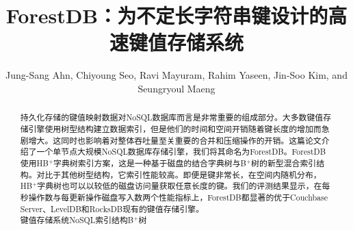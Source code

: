 \documentclass[lang=cn]{cls/elegantpaper}
\title{ForestDB：为不定长字符串键设计的高速键值存储系统}
\author{Jung-Sang Ahn, Chiyoung Seo, Ravi Mayuram, Rahim Yaseen, Jin-Soo Kim, and Seungryoul Maeng}
\begin{document}
\maketitle

\begin{abstract}
\noindent \sffamily 持久化存储的键值映射数据对NoSQL数据库而言是非常重要的组成部分。大多数键值存储引擎使用树型结构建立数据索引，但是他们的时间和空间开销随着键长度的增加而急剧增大。这同时也影响着对整体吞吐量至关重要的合并和压缩操作的开销。这篇论文介绍了一个单节点大规模NoSQL数据库存储引擎，我们将其命名为ForestDB。ForestDB使用HB$^+$字典树索引方案，这是一种基于磁盘的结合字典树与B$^+$树的新型混合索引结构。对比于其他树型结构，它索引性能较高。即便是键非常长，在空间内随机分布，HB$^+$字典树也可以以较低的磁盘访问量获取任意长度的键。我们的评测结果显示，在每秒操作数与每更新操作磁盘写入数两个性能指标上，ForestDB都显著的优于Couchbase Server、LevelDB和RocksDB现有的键值存储引擎。\\

\noindent {} 键值存储系统\quad NoSQL\quad 索引结构\quad B$^+$树
\end{abstract}









\end{document}
